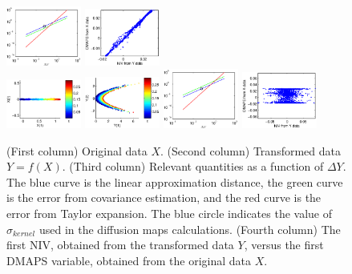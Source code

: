 \documentclass[12pt]{article}
\begin{document}
\begin{figure}
\includegraphics[width=0.22\textwidth]{error_terms_4}
\includegraphics[width=0.22\textwidth]{dmaps_corr_4} \\
%
\includegraphics[width=0.22\textwidth]{orig_data_5}
\includegraphics[width=0.22\textwidth]{function_data_5}
\includegraphics[width=0.22\textwidth]{error_terms_5}
\includegraphics[width=0.22\textwidth]{dmaps_corr_5}
\caption{(First column) Original data $X$. (Second column) Transformed data $Y = f(X)$. (Third column) Relevant quantities as a function of $\Delta Y$. The blue curve is the linear approximation distance, the green curve is the error from covariance estimation, and the red curve is the error from Taylor expansion. The blue circle indicates the value of $\sigma_{kernel}$ used in the diffusion maps calculations. (Fourth column) The first NIV, obtained from the transformed data $Y$, versus the first DMAPS variable, obtained from the original data $X$. }
\end{figure}
\end{document}
